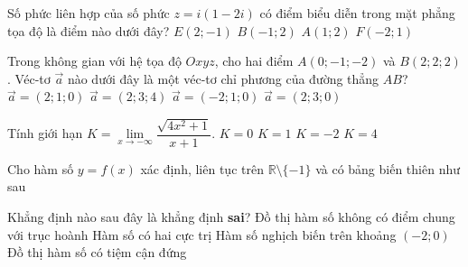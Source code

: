 \begin{ex}%
Số phức liên hợp của số phức $z=i(1-2i)$ có điểm biểu diễn trong mặt phẳng tọa độ là điểm nào dưới đây?
\choice
{\True $E(2;-1)$}
{$B(-1;2)$}
{$A(1;2)$}
{$F(-2;1)$}
\end{ex}

\begin{ex}%
Trong không gian với hệ tọa độ $Oxyz$, cho hai điểm $A(0;-1;-2)$ và $B(2;2;2)$. Véc-tơ $\overrightarrow{a}$ nào dưới đây là một véc-tơ chỉ phương của đường thẳng $AB$?
\choice
{$\overrightarrow{a}=(2;1;0)$}
{\True $\overrightarrow{a}=(2;3;4)$}
{$\overrightarrow{a}=(-2;1;0)$}
{$\overrightarrow{a}=(2;3;0)$}
\end{ex}

\begin{ex}%
Tính giới hạn $K=\lim\limits_{x\rightarrow -\infty}\dfrac{\sqrt{4x^2+1}}{x+1}$.
\choice
{$K=0$}
{$K=1$}
{\True $K=-2$}
{$K=4$}
\end{ex}

\begin{ex}%
Cho hàm số $y=f(x)$ xác định, liên tục trên $\mathbb{R}\setminus \{-1\}$ và có bảng biến thiên như sau
\begin{center}
\end{center}
Khẳng định nào sau đây là khẳng định \textbf{sai}?
\choice
{Đồ thị hàm số không có điểm chung với trục hoành}
{Hàm số có hai cực trị}
{\True Hàm số nghịch biến trên khoảng $(-2;0)$}
{Đồ thị hàm số có tiệm cận đứng}
\end{ex}


